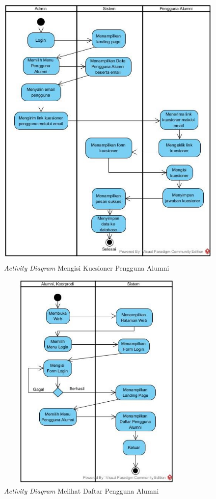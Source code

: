 \begin{figure}[H]
	\centering
	\includegraphics[width=12cm,height=14cm]{gambar/Activitykuesionerpengguna}
	\caption{\emph{Activity Diagram} Mengisi Kuesioner Pengguna Alumni}
	\label{activity_kuesionerpengguna}
\end{figure}

\begin{figure}[H]
	\centering
	\includegraphics[width=10cm,height=11cm]{gambar/Activitymelihatpengguna}
	\caption{\emph{Activity Diagram} Melihat Daftar Pengguna Alumni}
	\label{activity_kuesionerpengguna}
\end{figure}

